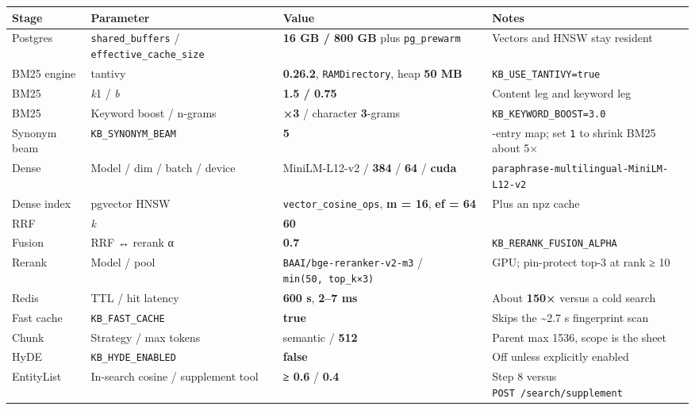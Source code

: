 \begin{longtable}[]{@{}
  >{\raggedright\arraybackslash}p{}
  >{\raggedright\arraybackslash}p{}
  >{\raggedright\arraybackslash}p{}
  >{\raggedright\arraybackslash}p{}@{}}
\toprule\noalign{}
Stage & Parameter & Value & Notes \\
\midrule\noalign{}
\endhead
\bottomrule\noalign{}
\endlastfoot
Postgres & \texttt{shared\_buffers} / \texttt{effective\_cache\_size} & \textbf{16 GB / 800 GB} plus \texttt{pg\_prewarm} & Vectors and HNSW stay resident \\
BM25 engine & tantivy & \textbf{0.26.2}, \texttt{RAMDirectory}, heap \textbf{50 MB} & \texttt{KB\_USE\_TANTIVY=true} \\
BM25 & \emph{k}1 / \emph{b} & \textbf{1.5 / 0.75} & Content leg and keyword leg \\
BM25 & Keyword boost / n-grams & \textbf{×3} / character \textbf{3}-grams & \texttt{KB\_KEYWORD\_BOOST=3.0} \\
Synonym beam & \texttt{KB\_SYNONYM\_BEAM} & \textbf{5} & 93-entry map; set \texttt{1} to shrink BM25 about 5× \\
Dense & Model / dim / batch / device & MiniLM-L12-v2 / \textbf{384} / \textbf{64} / \textbf{cuda} & \texttt{paraphrase-multilingual-MiniLM-L12-v2} \\
Dense index & pgvector HNSW & \texttt{vector\_cosine\_ops}, \textbf{m = 16}, \textbf{ef = 64} & Plus an npz cache \\
RRF & \emph{k} & \textbf{60} & \\
Fusion & RRF ↔ rerank α & \textbf{0.7} & \texttt{KB\_RERANK\_FUSION\_ALPHA} \\
Rerank & Model / pool & \texttt{BAAI/bge-reranker-v2-m3} / \texttt{min(50,\ top\_k×3)} & GPU; pin-protect top-3 at rank ≥ 10 \\
Redis & TTL / hit latency & \textbf{600 s}, \textbf{2--7 ms} & About \textbf{150×} versus a cold search \\
Fast cache & \texttt{KB\_FAST\_CACHE} & \textbf{true} & Skips the \textasciitilde2.7 s fingerprint scan \\
Chunk & Strategy / max tokens & semantic / \textbf{512} & Parent max 1536, scope is the sheet \\
HyDE & \texttt{KB\_HYDE\_ENABLED} & \textbf{false} & Off unless explicitly enabled \\
EntityList & In-search cosine / supplement tool & \textbf{≥ 0.6} / \textbf{0.4} & Step 8 versus \texttt{POST\ /search/supplement} \\
\end{longtable}

